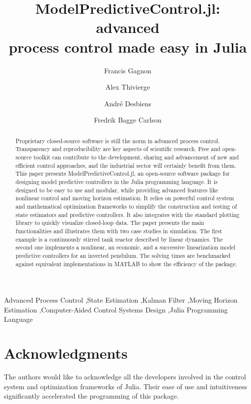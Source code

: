 \documentclass[5p,authoryear]{elsarticle}
\begin{document}
\begin{frontmatter}

\title{ModelPredictiveControl.jl: advanced\\process control made easy in Julia}

\author[jumine]{Francis Gagnon}
\author[jumine]{Alex Thivierge}
\author[loop]{André Desbiens}
\author[juliahub]{Fredrik Bagge Carlson}

\address[jumine]{Jumine, Quebec City, Canada}
\address[loop]{Process Observation and Optimization Laboratory (LOOP), Université Laval, Quebec City, Canada}
\address[juliahub]{JuliaHub, Lund, Sweden}

\begin{abstract}
Proprietary closed-source software is still the norm in advanced process control. Transparency and reproducibility are key aspects of scientific research. Free and open-source toolkit can contribute to the development, sharing and advancement of  new and efficient control approaches, and the industrial sector will certainly benefit from them. This paper presents ModelPredictiveControl.jl, an open-source software package for designing model predictive controllers in the Julia programming language. It is designed to be easy to use and modular, while providing advanced features like nonlinear control and moving horizon estimation. It relies on powerful control system and mathematical optimization frameworks to simplify the construction and testing of state estimators and predictive controllers. It also integrates with the standard plotting library to quickly visualize closed-loop data. The paper presents the main functionalities and illustrates them with two case studies in simulation. The first example is a continuously stirred tank reactor described by linear dynamics. The second one implements a nonlinear, an economic, and a successive linearization model predictive controllers for an inverted pendulum. The solving times are benchmarked against equivalent implementations in MATLAB to show the efficiency of the package.
\end{abstract}
    

\begin{keyword}
Advanced Process Control \sep State Estimation \sep Kalman Filter \sep Moving Horizon Estimation \sep Computer-Aided Control Systems Design \sep Julia Programming Language
\end{keyword}

\end{frontmatter}






\section*{Acknowledgments}
The authors would like to acknowledge all the developers involved in the control system and optimization frameworks of Julia. Their ease of use and intuitiveness  significantly accelerated the programming of this package.


 
\end{document}
